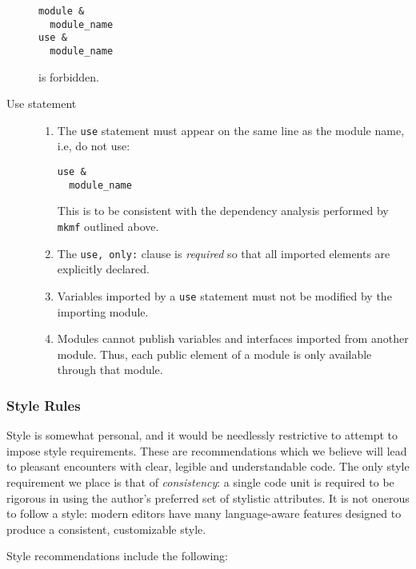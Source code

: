 \begin{description}
\begin{verbatim}
module &
  module_name
use &
  module_name
\end{verbatim}

  is forbidden.
  
\item[Use statement]
\begin{enumerate}

\item The \texttt{use} statement must appear on the same line as
  the module name, i.e, do not use:

\begin{verbatim}
use &
  module_name
\end{verbatim}

  This is to be consistent with the dependency analysis performed by
  \texttt{mkmf} outlined above.
\item The \texttt{use, only:} clause is \emph{required} so that all
  imported elements are explicitly declared.
\item Variables imported by a \texttt{use} statement must not be
  modified by the importing module.
\item Modules cannot publish variables and interfaces imported from
  another module. Thus, each public element of a module is only
  available through that module. 
\end{enumerate}

\end{description}

\subsubsection{Style Rules}

Style is somewhat personal, and it would be needlessly restrictive to
attempt to impose style requirements. These are recommendations which
we believe will lead to pleasant encounters with clear, legible and
understandable code. The only style requirement we place is that of
{\it consistency}: a single code unit is required to be rigorous in
using the author's preferred set of stylistic attributes.  It is not
onerous to follow a style: modern editors have many language-aware
features designed to produce a consistent, customizable style.

Style recommendations include the following:

